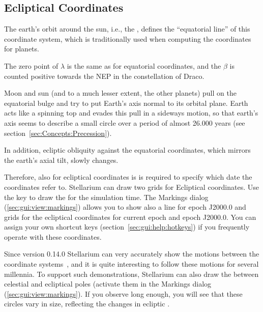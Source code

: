 \subsection{Ecliptical Coordinates}
\label{sec:Concepts:Ecliptical}

The earth's orbit around the sun, i.e., the ,
defines the ``equatorial line'' of this coordinate system, which is
traditionally used when computing the coordinates for planets.

The zero point of  $\lambda$ is the
same as for equatorial coordinates, and the  $\beta$ is counted positive towards the
 NEP in the constellation of
Draco.

Moon and sun (and to a much lesser extent, the other planets) pull on
the equatorial bulge and try to put Earth's axis normal to its orbital
plane. Earth acts like a spinning top and evades this pull in a
sideways motion, so that earth's axis seems to describe a small circle
over a period of almost 26.000 years (see
section~\ref{sec:Concepts:Precession}). 

In addition, ecliptic obliquity against the equatorial coordinates,
which mirrors the earth's axial tilt, slowly changes.

Therefore, also for ecliptical coordinates is is required to specify
which date the coordinates refer to.  Stellarium can draw two grids
for Ecliptical coordinates. Use the \key{,} key to draw the 
for the simulation time. The Markings dialog
(\ref{sec:gui:view:markings}) allows you to show also a line for epoch
J2000.0 and grids for the ecliptical coordinates for current epoch and
epoch J2000.0. You can assign your own shortcut keys
(section~\ref{sec:gui:help:hotkeys}) if you frequently operate with
these coordinates.

Since version 0.14.0 Stellarium can very accurately show the motions
between the coordinate systems~\citep{2011AA:Vondrak, 2012AA:Vondrak}, and it is quite
interesting to follow these motions for several millennia. To support
such demonstrations, Stellarium can also draw the
 between celestial and ecliptical poles
(activate them in the Markings dialog
(\ref{sec:gui:view:markings}). If you observe long enough, you will
see that these circles vary in size, reflecting the changes in
ecliptic .




